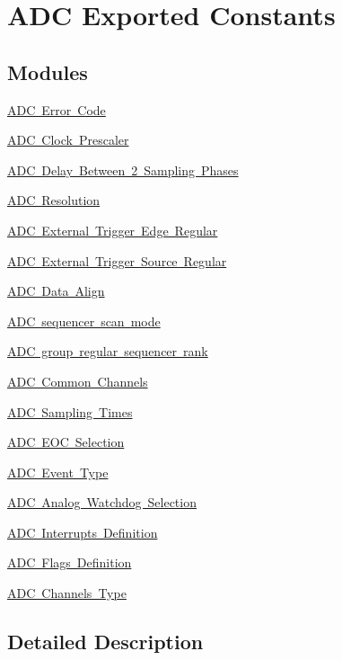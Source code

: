 \hypertarget{group___a_d_c___exported___constants}{}\section{A\+DC Exported Constants}
\label{group___a_d_c___exported___constants}
\subsection*{Modules}
\begin{DoxyCompactItemize}
\item 
\mbox{\hyperlink{group___a_d_c___error___code}{A\+D\+C Error Code}}
\item 
\mbox{\hyperlink{group___a_d_c___clock_prescaler}{A\+D\+C Clock Prescaler}}
\item 
\mbox{\hyperlink{group___a_d_c__delay__between__2__sampling__phases}{A\+D\+C Delay Between 2 Sampling Phases}}
\item 
\mbox{\hyperlink{group___a_d_c___resolution}{A\+D\+C Resolution}}
\item 
\mbox{\hyperlink{group___a_d_c___external__trigger__edge___regular}{A\+D\+C External Trigger Edge Regular}}
\item 
\mbox{\hyperlink{group___a_d_c___external__trigger___source___regular}{A\+D\+C External Trigger Source Regular}}
\item 
\mbox{\hyperlink{group___a_d_c___data___align}{A\+D\+C Data Align}}
\item 
\mbox{\hyperlink{group___a_d_c___scan__mode}{A\+D\+C sequencer scan mode}}
\item 
\mbox{\hyperlink{group___a_d_c__regular__rank}{A\+D\+C group regular sequencer rank}}
\item 
\mbox{\hyperlink{group___a_d_c__channels}{A\+D\+C Common Channels}}
\item 
\mbox{\hyperlink{group___a_d_c__sampling__times}{A\+D\+C Sampling Times}}
\item 
\mbox{\hyperlink{group___a_d_c___e_o_c_selection}{A\+D\+C E\+O\+C Selection}}
\item 
\mbox{\hyperlink{group___a_d_c___event__type}{A\+D\+C Event Type}}
\item 
\mbox{\hyperlink{group___a_d_c__analog__watchdog__selection}{A\+D\+C Analog Watchdog Selection}}
\item 
\mbox{\hyperlink{group___a_d_c__interrupts__definition}{A\+D\+C Interrupts Definition}}
\item 
\mbox{\hyperlink{group___a_d_c__flags__definition}{A\+D\+C Flags Definition}}
\item 
\mbox{\hyperlink{group___a_d_c__channels__type}{A\+D\+C Channels Type}}
\end{DoxyCompactItemize}


\subsection{Detailed Description}
